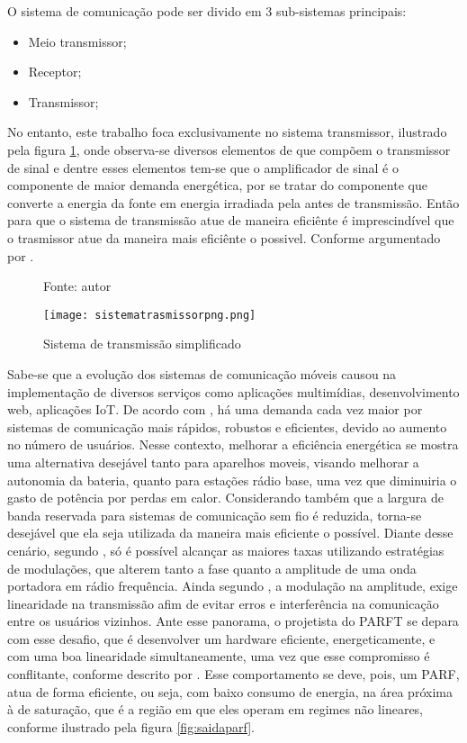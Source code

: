 O sistema de comunicação pode ser divido em 3 sub-sistemas principais:
\begin{itemize}
    \item Meio transmissor;
    \item Receptor;
    \item Transmissor;
\end{itemize}

No entanto, este trabalho foca exclusivamente no sistema transmissor, ilustrado pela figura \ref{fig:sistemadetrasmissao}, onde observa-se diversos elementos de que compõem o transmissor de sinal e dentre esses elementos tem-se que o amplificador de sinal é o componente de maior demanda energética, por se tratar do componente que converte a energia da fonte em energia irradiada pela antes de transmissão. Então para que o sistema de transmissão atue de maneira eficiênte é imprescindível que o trasmissor atue da maneira mais eficiênte o possivel. Conforme argumentado por \cite{Schuartz2017}.

\begin{figure}[ht!]
    \centering
    \captionsetup{justification=centering}
    \caption*{Fonte: autor}
    \texttt{[image: sistematrasmissorpng.png]}
    \caption{Sistema de transmissão simpliﬁcado}
    \label{fig:sistemadetrasmissao}
\end{figure}

Sabe-se que a evolução dos sistemas de comunicação móveis causou na implementação de diversos serviços como aplicações multimídias, desenvolvimento web, aplicações IoT. De acordo com \cite{John2016}, há uma demanda cada vez maior por sistemas de comunicação mais rápidos, robustos e eficientes, devido ao aumento no número de usuários.  Nesse contexto, melhorar a eficiência energética se mostra uma alternativa desejável tanto para aparelhos moveis, visando melhorar a autonomia da bateria, quanto para estações rádio base, uma vez que diminuiria o gasto de potência por perdas em calor. Considerando também que a largura de banda reservada para sistemas de comunicação sem fio é reduzida, torna-se desejável que ela seja utilizada da maneira mais eficiente o possível. Diante desse cenário, segundo \cite{Kenington2000}, só é possível alcançar as maiores taxas utilizando estratégias de modulações, que alterem tanto a fase quanto a amplitude de uma onda portadora em rádio frequência. Ainda segundo \cite{Kenington2000}, a modulação na amplitude, exige linearidade na transmissão afim de evitar erros e interferência na comunicação entre os usuários vizinhos. Ante esse panorama, o projetista do PARFT se depara com esse desafio, que é desenvolver um hardware eficiente, energeticamente, e com uma boa linearidade simultaneamente, uma vez que esse compromisso é conflitante, conforme descrito por \cite{Cripps2006}. Esse comportamento se deve, pois, um PARF, atua de forma eficiente, ou seja, com baixo consumo de energia, na área próxima à de saturação, que é a região em que eles operam em regimes não lineares, conforme ilustrado pela figura \ref{fig:saidaparf}.

